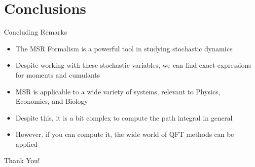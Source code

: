 \documentclass{beamer}
\begin{document}
\section{Conclusions}
\begin{frame}{Concluding Remarks}
  \begin{itemize}
  \item The MSR Formalism is a powerful tool in studying stochastic dynamics
  \item Despite working with these stochastic variables, we can find exact expressions for moments and cumulants
  \item MSR is applicable to a wide variety of systems, relevant to Physics, Economics, and Biology
  \item Despite this, it is a bit complex to compute the path integral in general
  \item However, if you can compute it, the wide world of QFT methods can be applied
  \end{itemize}
\end{frame}

\begin{frame}
  \begin{center}
    \Huge{Thank You!}
  \end{center}
\end{frame}
\end{document}
